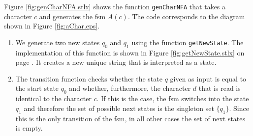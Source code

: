 \begin{enumerate}
      Figure \ref{fig:genCharNFA.stlx} shows the function \texttt{genCharNFA} that takes a
      character $c$ and generates the fsm $A(c)$.  The code corresponds to the
      diagram shown in Figure \ref{fig:aChar.eps}.
      \begin{enumerate}
      \item We generate two new states $q_0$ and $q_1$ using the function
            \texttt{getNewState}.  The implementation of this function is shown in Figure
            \ref{fig:getNewState.stlx} on page \pageref{fig:getNewState.stlx}.  It creates a new 
            unique string that is interpreted as a state.
      \item The transition function checks whether the state $q$ given as input is equal
            to the start state $q_0$ and whether, furthermore, the character $d$ that is
            read is identical to the character $c$.  If this is the case, the fsm switches
            into the state $q_1$ and therefore the set of possible next states is the singleton
            set $\{ q_1 \}$.  Since this is the only transition of the fsm, in all other
            cases the set of next states is empty.
      \end{enumerate}
      

\end{enumerate}
